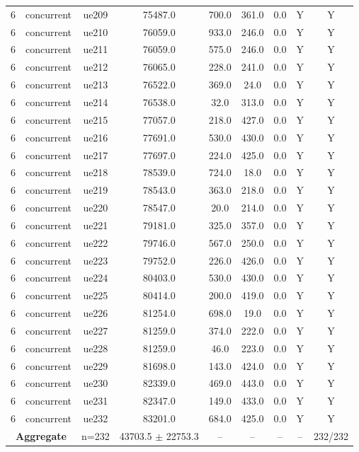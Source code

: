 \begin{table}[ht]
\begin{tabular}{|c|c|c|c|c|c|c|c|c|}
6 & concurrent & ue209 & 75487.0 & 700.0 & 361.0 & 0.0 & Y & Y \\
6 & concurrent & ue210 & 76059.0 & 933.0 & 246.0 & 0.0 & Y & Y \\
6 & concurrent & ue211 & 76059.0 & 575.0 & 246.0 & 0.0 & Y & Y \\
6 & concurrent & ue212 & 76065.0 & 228.0 & 241.0 & 0.0 & Y & Y \\
6 & concurrent & ue213 & 76522.0 & 369.0 & 24.0 & 0.0 & Y & Y \\
6 & concurrent & ue214 & 76538.0 & 32.0 & 313.0 & 0.0 & Y & Y \\
6 & concurrent & ue215 & 77057.0 & 218.0 & 427.0 & 0.0 & Y & Y \\
6 & concurrent & ue216 & 77691.0 & 530.0 & 430.0 & 0.0 & Y & Y \\
6 & concurrent & ue217 & 77697.0 & 224.0 & 425.0 & 0.0 & Y & Y \\
6 & concurrent & ue218 & 78539.0 & 724.0 & 18.0 & 0.0 & Y & Y \\
6 & concurrent & ue219 & 78543.0 & 363.0 & 218.0 & 0.0 & Y & Y \\
6 & concurrent & ue220 & 78547.0 & 20.0 & 214.0 & 0.0 & Y & Y \\
6 & concurrent & ue221 & 79181.0 & 325.0 & 357.0 & 0.0 & Y & Y \\
6 & concurrent & ue222 & 79746.0 & 567.0 & 250.0 & 0.0 & Y & Y \\
6 & concurrent & ue223 & 79752.0 & 226.0 & 426.0 & 0.0 & Y & Y \\
6 & concurrent & ue224 & 80403.0 & 530.0 & 430.0 & 0.0 & Y & Y \\
6 & concurrent & ue225 & 80414.0 & 200.0 & 419.0 & 0.0 & Y & Y \\
6 & concurrent & ue226 & 81254.0 & 698.0 & 19.0 & 0.0 & Y & Y \\
6 & concurrent & ue227 & 81259.0 & 374.0 & 222.0 & 0.0 & Y & Y \\
6 & concurrent & ue228 & 81259.0 & 46.0 & 223.0 & 0.0 & Y & Y \\
6 & concurrent & ue229 & 81698.0 & 143.0 & 424.0 & 0.0 & Y & Y \\
6 & concurrent & ue230 & 82339.0 & 469.0 & 443.0 & 0.0 & Y & Y \\
6 & concurrent & ue231 & 82347.0 & 149.0 & 433.0 & 0.0 & Y & Y \\
6 & concurrent & ue232 & 83201.0 & 684.0 & 425.0 & 0.0 & Y & Y \\
\multicolumn{2}{|c|}{\textbf{Aggregate}} & n=232 & 43703.5 $\pm$ 22753.3 & -- & -- & -- & -- & 232/232 \\

\end{tabular}
\end{table}
